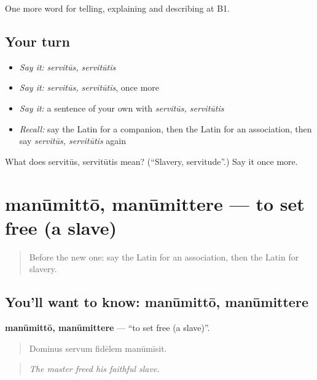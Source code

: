 \begin{grammarlens}[title={What you've built}]
One more word for telling, explaining and describing at B1.
\end{grammarlens}

\subsection*{Your turn}
\begin{itemize}
\raggedright
  \item \emph{Say it:} \emph{servitūs, servitūtis}
  \item \emph{Say it:} \emph{servitūs, servitūtis}, once more
  \item \emph{Say it:} a sentence of your own with \emph{servitūs, servitūtis}
  \item \emph{Recall:} say the Latin for a companion, then the Latin for an association, then say \emph{servitūs, servitūtis} again
\end{itemize}

\begin{tcolorbox}[breakable,colback=teal!4,colframe=teal!35!black,title={Before you move on}]
What does servitūs, servitūtis mean? (\textquotedblleft{}Slavery, servitude\textquotedblright{}.) Say it once more.
\end{tcolorbox}
\section[manūmittō, manūmittere]{manūmittō, manūmittere — to set free (a slave)}

\label{lesson:LA-C389-manumitto}



\begin{quote}
Before the new one: say the Latin for an association, then the Latin for slavery.
\end{quote}

\subsection*{You'll want to know: manūmittō, manūmittere}
\textbf{manūmittō, manūmittere} — \textquotedblleft{}to set free (a slave)\textquotedblright{}.

\begin{quote}
Dominus servum fidēlem manūmīsit.
\end{quote}

\begin{quote}
\emph{The master freed his faithful slave.}
\end{quote}


